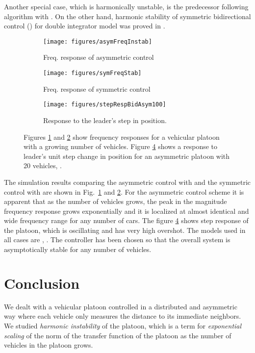 \documentclass[technote, 10pt, twoside]{IEEEtran}
\theoremstyle{plain}
\theoremstyle{definition}
\theoremstyle{assump}
\begin{document}
Another special case, which is harmonically unstable, is the predecessor following algorithm with . On the other hand, harmonic stability
of symmetric bidirectional control () for double integrator model was proved in \cite{Veerman2007}. 
 \begin{figure}[t] 
\centering
	\begin{subfigure}[b]{0.35\textwidth}
	\texttt{[image: figures/asymFreqInstab]}
	\caption{Freq. response of asymmetric control}
	\label{fig:stringInstab}
	\end{subfigure}   
	\begin{subfigure}[b]{0.35\textwidth} 
	\texttt{[image: figures/symFreqStab]}	
	\caption{Freq. response of symmetric control}\label{fig:stringStab}  
	\end{subfigure} 
	\begin{subfigure}[b]{0.35\textwidth}
	\texttt{[image: figures/stepRespBidAsym100]}	
	\caption{Response to the leader's step in position.}\label{fig:stepResp}
	\end{subfigure}
	\caption{Figures \ref{fig:stringInstab} and \ref{fig:stringStab} show frequency
	responses for a vehicular platoon with a growing number of vehicles. Figure \ref{fig:stepResp} shows a response to leader's unit step change
	in position for an asymmetric platoon with 20 vehicles, .}
	\vspace{-10pt}
\end{figure} 

The simulation results comparing the asymmetric control with  and the symmetric control with  are shown in Fig.~\ref{fig:stringInstab} and \ref{fig:stringStab}. For the asymmetric control scheme it is apparent that as the number of vehicles grows, the peak in the magnitude frequency response
grows exponentially and it is localized at almost identical and wide frequency
range for any number of cars. The figure \ref{fig:stepResp} shows step
response of the platoon, which is oscillating and has very high overshot. The
models used in all cases are , . The controller has been chosen so that the overall system is asymptotically stable for any number of vehicles.
  
\section{Conclusion}
We dealt with a vehicular platoon controlled in a distributed and asymmetric way
where each vehicle only measures the distance to its immediate neighbors. 
We studied \textit{harmonic instability} of
the platoon, which is a term 
for \textit{exponential scaling}
of the  norm of the transfer function of the platoon as the
number of vehicles in the platoon grows. 
\end{document}
